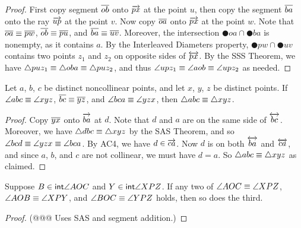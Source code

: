 \begin{proof}
First copy segment \(\overline{ob}\) onto \(\overrightarrow{px}\) at the point \(u\), then copy the segment \(\overline{ba}\) onto the ray \(\overrightarrow{up}\) at the point \(v\).
Now copy \(\overline{oa}\) onto \(\overrightarrow{px}\) at the point \(w\).
Note that \(\overline{oa} \equiv \overline{pw}\), \(\overline{ob} \equiv \overline{pu}\), and \(\overline{ba} \equiv \overline{uv}\).
Moreover, the intersection \(\CIRCLE{o}{a} \cap \CIRCLE{b}{a}\) is nonempty, as it contains \(a\).
By the Interleaved Diameters property, \(\CIRCLE{p}{w} \cap \CIRCLE{u}{v}\) contains two points \(z_1\) and \(z_2\) on opposite sides of \(\overleftrightarrow{px}\).
By the SSS Theorem, we have \(\bigtriangleup{puz_1} \equiv \bigtriangleup{oba} \equiv \bigtriangleup{puz_2}\), and thus \(\angle{upz_1} \equiv \angle{aob} \equiv \angle{upz_2}\) as needed.
\end{proof}

\begin{prop}
Let \(a\), \(b\), \(c\) be distinct noncollinear points, and let \(x\), \(y\), \(z\) be distinct points.
If \(\angle{abc} \equiv \angle{xyz}\), \(\overline{bc} \equiv \overline{yz}\), and \(\angle{bca} \equiv \angle{yzx}\), then \(\bigtriangleup{abc} \equiv \bigtriangleup{xyz}\).
\end{prop}

\begin{proof}
Copy \(\overline{yx}\) onto \(\overrightarrow{ba}\) at \(d\).
Note that \(d\) and \(a\) are on the same side of \(\overleftrightarrow{bc}\).
Moreover, we have \(\bigtriangleup{dbc} \equiv \bigtriangleup{xyz}\) by the SAS Theorem, and so \(\angle{bcd} \equiv \angle{yzx} \equiv \angle{bca}\).
By AC4, we have \(d \in \overrightarrow{ca}\).
Now \(d\) is on both \(\overleftrightarrow{ba}\) and \(\overleftrightarrow{ca}\), and since \(a\), \(b\), and \(c\) are not collinear, we must have \(d = a\).
So \(\bigtriangleup{abc} \equiv \bigtriangleup{xyz}\) as claimed.
\end{proof}

\begin{prop}
Suppose \(B \in \mathsf{int}\angle{AOC}\) and \(Y \in \mathsf{int}\angle{XPZ}\).
If any two of \(\angle{AOC} \equiv \angle{XPZ}\), \(\angle{AOB} \equiv \angle{XPY}\), and \(\angle{BOC} \equiv \angle{YPZ}\) holds, then so does the third.
\end{prop}

\begin{proof}
(@@@ Uses SAS and segment addition.)
\end{proof}
